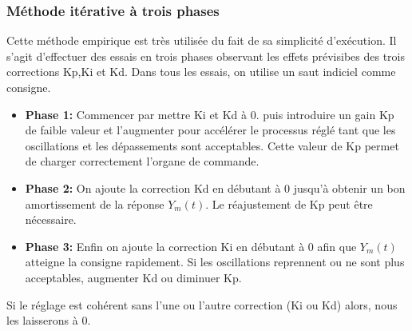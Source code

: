 \subsubsection{Méthode itérative à trois phases}
Cette méthode empirique est très utilisée du fait de sa simplicité d'exécution. Il s'agit d'effectuer des essais en trois phases observant les effets prévisibes des trois corrections Kp,Ki et Kd. Dans tous les essais, on utilise un saut indiciel comme consigne.\\
\begin{itemize}
	\item \textbf{Phase 1:} Commencer par mettre Ki et Kd à 0. puis introduire un gain Kp de faible valeur et l'augmenter pour accélérer le processus réglé tant que les oscillations et les dépassements sont acceptables. Cette valeur de Kp permet de charger correctement l'organe de commande.
	\item \textbf{Phase 2:} On ajoute la correction Kd en débutant à 0 jusqu'à obtenir un bon amortissement de la réponse $Y_m(t)$. Le réajustement de Kp peut être nécessaire.
	\item \textbf{Phase 3:} Enfin on ajoute la correction Ki en débutant à 0 afin que $Y_m(t)$ atteigne la consigne rapidement. Si les oscillations reprennent ou ne sont plus acceptables, augmenter Kd ou diminuer Kp.
\end{itemize}

Si le réglage est cohérent sans l'une ou l'autre correction (Ki ou Kd) alors, nous les laisserons à 0. 
